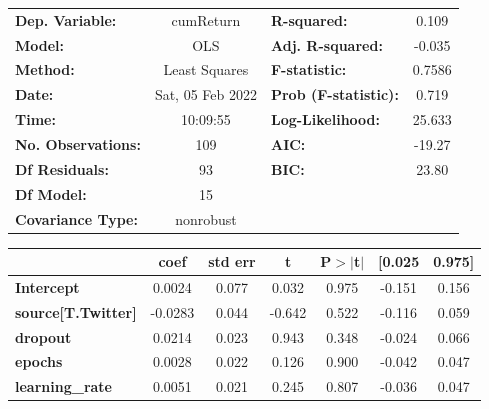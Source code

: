 \begin{center}
\begin{tabular}{lclc}
\toprule
\textbf{Dep. Variable:}              &    cumReturn     & \textbf{  R-squared:         } &     0.109   \\
\textbf{Model:}                      &       OLS        & \textbf{  Adj. R-squared:    } &    -0.035   \\
\textbf{Method:}                     &  Least Squares   & \textbf{  F-statistic:       } &    0.7586   \\
\textbf{Date:}                       & Sat, 05 Feb 2022 & \textbf{  Prob (F-statistic):} &    0.719    \\
\textbf{Time:}                       &     10:09:55     & \textbf{  Log-Likelihood:    } &    25.633   \\
\textbf{No. Observations:}           &         109      & \textbf{  AIC:               } &    -19.27   \\
\textbf{Df Residuals:}               &          93      & \textbf{  BIC:               } &     23.80   \\
\textbf{Df Model:}                   &          15      & \textbf{                     } &             \\
\textbf{Covariance Type:}            &    nonrobust     & \textbf{                     } &             \\
\bottomrule
\end{tabular}
\begin{tabular}{lcccccc}
                                     & \textbf{coef} & \textbf{std err} & \textbf{t} & \textbf{P$> |$t$|$} & \textbf{[0.025} & \textbf{0.975]}  \\
\midrule
\textbf{Intercept}                   &       0.0024  &        0.077     &     0.032  &         0.975        &       -0.151    &        0.156     \\
\textbf{source[T.Twitter]}           &      -0.0283  &        0.044     &    -0.642  &         0.522        &       -0.116    &        0.059     \\
\textbf{dropout}                     &       0.0214  &        0.023     &     0.943  &         0.348        &       -0.024    &        0.066     \\
\textbf{epochs}                      &       0.0028  &        0.022     &     0.126  &         0.900        &       -0.042    &        0.047     \\
\textbf{learning\_rate}              &       0.0051  &        0.021     &     0.245  &         0.807        &       -0.036    &        0.047     \\

\end{tabular}
\end{center}
